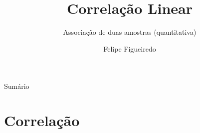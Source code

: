 \documentclass{beamer}
\title%
{Correlação Linear}
\subtitle
{Associação de duas amostras (quantitativa)} %
\author%
{Felipe Figueiredo}%
\institute[INTO] %
{Instituto Nacional de Traumatologia e Ortopedia
}
\date%
{}
\begin{document}
\begin{frame}
  \titlepage
\end{frame}

\begin{frame}{Sumário}
  \tableofcontents
\end{frame}








\section{Correlação}
\end{document}

